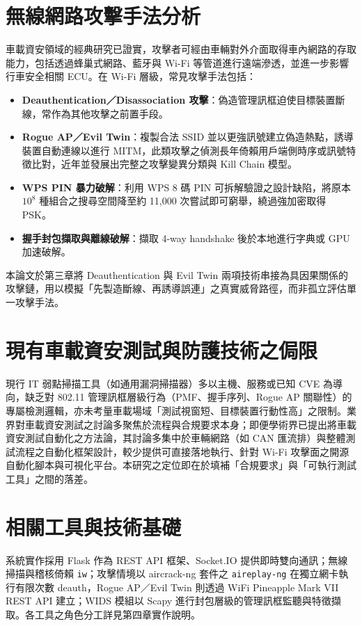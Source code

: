 \documentclass[12pt,a4paper,oneside]{report}
\begin{document}
\section{無線網路攻擊手法分析}
車載資安領域的經典研究已證實，攻擊者可經由車輛對外介面取得車內網路的存取能力，包括透過蜂巢式網路、藍牙與 Wi-Fi 等管道進行遠端滲透，並進一步影響行車安全相關 ECU\cite{checkoway2011comprehensive,koscher2010automobile,miller2015vehicle}。在 Wi-Fi 層級，常見攻擊手法包括：
\begin{itemize}
  \item \textbf{Deauthentication／Disassociation 攻擊}：偽造管理訊框迫使目標裝置斷線，常作為其他攻擊之前置手段。
  \item \textbf{Rogue AP／Evil Twin}：複製合法 SSID 並以更強訊號建立偽造熱點，誘導裝置自動連線以進行 MITM，此類攻擊之偵測長年倚賴用戶端側時序或訊號特徵比對\cite{han2011timingrogueap}，近年並發展出完整之攻擊變異分類與 Kill Chain 模型\cite{augustyniak2026eviltwin}。
  \item \textbf{WPS PIN 暴力破解}：利用 WPS 8 碼 PIN 可拆解驗證之設計缺陷，將原本 $10^{8}$ 種組合之搜尋空間降至約 11,000 次嘗試即可窮舉，繞過強加密取得 PSK\cite{viehbock2011wps}。
  \item \textbf{握手封包擷取與離線破解}：擷取 4-way handshake 後於本地進行字典或 GPU 加速破解。
\end{itemize}
本論文於第三章將 Deauthentication 與 Evil Twin 兩項技術串接為具因果關係的攻擊鏈，用以模擬「先製造斷線、再誘導誤連」之真實威脅路徑，而非孤立評估單一攻擊手法\cite{boumiza2017intrusion}。

\section{現有車載資安測試與防護技術之侷限}
現行 IT 弱點掃描工具（如通用漏洞掃描器）多以主機、服務或已知 CVE 為導向，缺乏對 802.11 管理訊框層級行為（PMF、握手序列、Rogue AP 關聯性）的專屬檢測邏輯，亦未考量車載場域「測試視窗短、目標裝置行動性高」之限制。業界對車載資安測試之討論多聚焦於流程與合規要求本身\cite{luo2022automotive,dennemeyer2025mobility}；即便學術界已提出將車載資安測試自動化之方法論\cite{marksteiner2019automation}，其討論多集中於車輛網路（如 CAN 匯流排）與整體測試流程之自動化框架設計，較少提供可直接落地執行、針對 Wi-Fi 攻擊面之開源自動化腳本與可視化平台。本研究之定位即在於填補「合規要求」與「可執行測試工具」之間的落差。

\section{相關工具與技術基礎}
系統實作採用 Flask 作為 REST API 框架、Socket.IO 提供即時雙向通訊；無線掃描與稽核倚賴 \texttt{iw}；攻擊情境以 aircrack-ng 套件之 \texttt{aireplay-ng} 在獨立網卡執行有限次數 deauth，Rogue AP／Evil Twin 則透過 WiFi Pineapple Mark VII REST API 建立；WIDS 模組以 Scapy 進行封包層級的管理訊框監聽與特徵擷取。各工具之角色分工詳見第四章實作說明。
\end{document}
